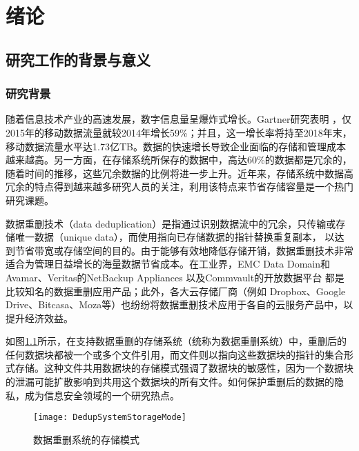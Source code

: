 \chapter{绪\hspace{6pt}论}

\section{研究工作的背景与意义}
\subsection{研究背景}

随着信息技术产业的高速发展，数字信息量呈爆炸式增长。Gartner研究表明 ，仅2015年的移动数据流量就较2014年增长59\%；并且，这一增长率将持至2018年末，移动数据流量水平达1.73亿TB。数据的快速增长导致企业面临的存储和管理成本越来越高。另一方面，在存储系统所保存的数据中，高达60\%的数据都是冗余的，随着时间的推移，这些冗余数据的比例将进一步上升。近年来，存储系统中数据高冗余的特点得到越来越多研究人员的关注，利用该特点来节省存储容量是一个热门研究课题。

数据重删技术（data deduplication）是指通过识别数据流中的冗余，只传输或存储唯一数据（unique data），而使用指向已存储数据的指针替换重复副本， 以达到节省带宽或存储空间的目的。由于能够有效地降低存储开销，数据重删技术非常适合为管理日益增长的海量数据节省成本。在工业界，EMC Data Domain和Avamar、Veritas的NetBackup Appliances 以及Commvault的开放数据平台 都是比较知名的数据重删应用产品；此外，各大云存储厂商（例如 Dropbox、Google Drive、Bitcasa、Moza等）也纷纷将数据重删技术应用于各自的云服务产品中，以提升经济效益。

如图\ref{fig:数据重删系统的存储模式}所示，在支持数据重删的存储系统（统称为数据重删系统）中，重删后的任何数据块都被一个或多个文件引用，而文件则以指向这些数据块的指针的集合形式存储。这种文件共用数据块的存储模式强调了数据块的敏感性，因为一个数据块的泄漏可能扩散影响到共用这个数据块的所有文件。如何保护重删后的数据的隐私，成为信息安全领域的一个研究热点。

\begin{figure}[!htb]
    \small
    \centering
    \texttt{[image: DedupSystemStorageMode]}
    \caption{数据重删系统的存储模式} 
    \label{fig:数据重删系统的存储模式}
\end{figure}

